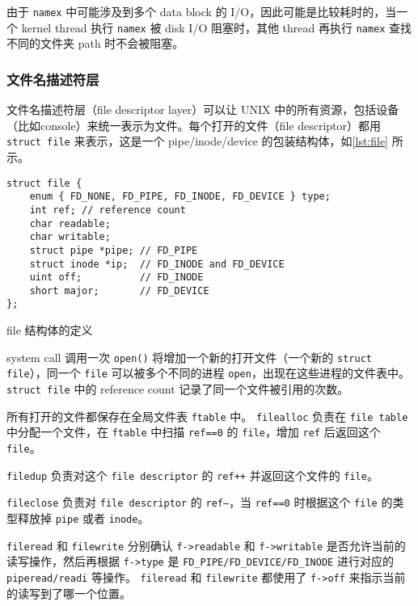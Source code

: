 由于 \texttt{namex} 中可能涉及到多个 data block 的 I/O，因此可能是比较耗时的，当一个 kernel thread 执行 \texttt{namex} 被 disk I/O 阻塞时，其他 thread 再执行 \texttt{namex} 查找不同的文件夹 path 时不会被阻塞。

\subsubsection{文件名描述符层}

文件名描述符层（file descriptor layer）可以让 UNIX 中的所有资源，包括设备（比如console）来统一表示为文件。每个打开的文件（file descriptor）都用 \texttt{struct file} 来表示，这是一个 pipe/inode/device 的包装结构体，如\cref{lst:file} 所示。

\begin{listing}[!htb]
	\begin{verbatim}
struct file {
    enum { FD_NONE, FD_PIPE, FD_INODE, FD_DEVICE } type;
    int ref; // reference count
    char readable;
    char writable;
    struct pipe *pipe; // FD_PIPE
    struct inode *ip;  // FD_INODE and FD_DEVICE
    uint off;          // FD_INODE
    short major;       // FD_DEVICE
};
	\end{verbatim}
	\caption{file 结构体的定义}\label{lst:file}
\end{listing}

system call 调用一次 \texttt{open()} 将增加一个新的打开文件（一个新的 \texttt{struct file}），同一个 \texttt{file} 可以被多个不同的进程 \texttt{open}，出现在这些进程的文件表中。 \texttt{struct file} 中的 reference count 记录了同一个文件被引用的次数。

所有打开的文件都保存在全局文件表 \texttt{ftable} 中。
\texttt{filealloc} 负责在 \texttt{file table} 中分配一个文件，在 \texttt{ftable} 中扫描 \texttt{ref==0} 的 \texttt{file}，增加 \texttt{ref} 后返回这个 \texttt{file}。

\texttt{filedup} 负责对这个 \texttt{file descriptor} 的 \texttt{ref++} 并返回这个文件的 \texttt{file}。

\texttt{fileclose} 负责对 \texttt{file descriptor} 的 \texttt{ref--}，当 \texttt{ref==0} 时根据这个 \texttt{file} 的类型释放掉 \texttt{pipe} 或者 \texttt{inode}。

\texttt{fileread} 和 \texttt{filewrite} 分别确认 \texttt{f->readable} 和 \texttt{f->writable} 是否允许当前的读写操作，然后再根据 \texttt{f->type} 是 \texttt{FD\_PIPE/FD\_DEVICE/FD\_INODE} 进行对应的 \texttt{piperead/readi} 等操作。 \texttt{fileread} 和 \texttt{filewrite} 都使用了 \texttt{f->off} 来指示当前的读写到了哪一个位置。

